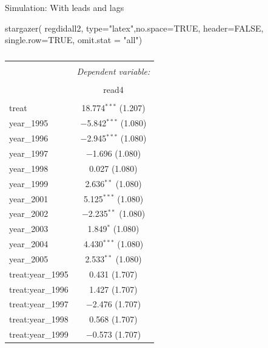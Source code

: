 \documentclass[
  ignorenonframetext,
]{beamer}
\newenvironment{Shaded}{\begin{snugshade}}{\end{snugshade}}
\newcommand{\AttributeTok}[1]{\textcolor[rgb]{0.77,0.63,0.00}{#1}}
\newcommand{\ConstantTok}[1]{\textcolor[rgb]{0.00,0.00,0.00}{#1}}
\newcommand{\FunctionTok}[1]{\textcolor[rgb]{0.00,0.00,0.00}{#1}}
\newcommand{\NormalTok}[1]{#1}
\newcommand{\StringTok}[1]{\textcolor[rgb]{0.31,0.60,0.02}{#1}}
\begin{document}
\begin{frame}[fragile]{Simulation: With leads and lags}
\protect\hypertarget{simulation-with-leads-and-lags-3}{}
\tiny

\begin{Shaded}
\begin{Highlighting}[]
\FunctionTok{stargazer}\NormalTok{( regdidall2, }\AttributeTok{type=}\StringTok{"latex"}\NormalTok{,}\AttributeTok{no.space=}\ConstantTok{TRUE}\NormalTok{, }\AttributeTok{header=}\ConstantTok{FALSE}\NormalTok{, }\AttributeTok{single.row=}\ConstantTok{TRUE}\NormalTok{, }\AttributeTok{omit.stat =} \StringTok{"all"}\NormalTok{)}
\end{Highlighting}
\end{Shaded}

\begin{table}[!htbp] \centering 
  \caption{} 
  \label{} 
\begin{tabular}{@{\extracolsep{5pt}}lc} 
\\[-1.8ex]\hline 
\hline \\[-1.8ex] 
 & \multicolumn{1}{c}{\textit{Dependent variable:}} \\ 
\cline{2-2} 
\\[-1.8ex] & read4 \\ 
\hline \\[-1.8ex] 
 treat & 18.774$^{***}$ (1.207) \\ 
  year\_1995 & $-$5.842$^{***}$ (1.080) \\ 
  year\_1996 & $-$2.945$^{***}$ (1.080) \\ 
  year\_1997 & $-$1.696 (1.080) \\ 
  year\_1998 & 0.027 (1.080) \\ 
  year\_1999 & 2.636$^{**}$ (1.080) \\ 
  year\_2001 & 5.125$^{***}$ (1.080) \\ 
  year\_2002 & $-$2.235$^{**}$ (1.080) \\ 
  year\_2003 & 1.849$^{*}$ (1.080) \\ 
  year\_2004 & 4.430$^{***}$ (1.080) \\ 
  year\_2005 & 2.533$^{**}$ (1.080) \\ 
  treat:year\_1995 & 0.431 (1.707) \\ 
  treat:year\_1996 & 1.427 (1.707) \\ 
  treat:year\_1997 & $-$2.476 (1.707) \\ 
  treat:year\_1998 & 0.568 (1.707) \\ 
  treat:year\_1999 & $-$0.573 (1.707) \\ 

\end{tabular}
\end{table}
\end{frame}
\end{document}
